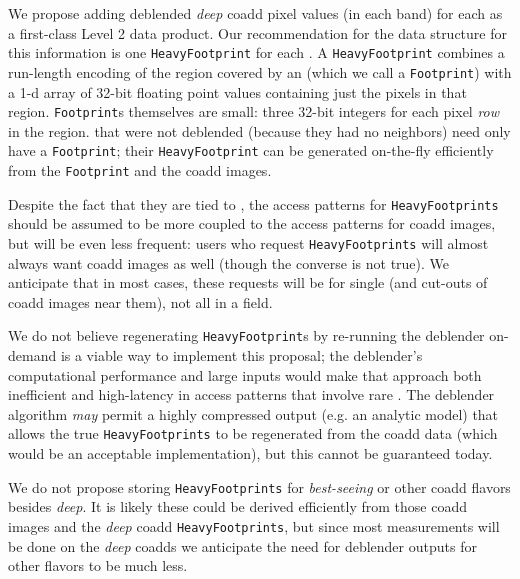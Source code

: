 \documentclass[DM,lsstdraft,toc]{lsstdoc}
\begin{document}
We propose adding deblended \emph{deep} coadd pixel values (in each band) for each \Object as a first-class Level 2 data product.  Our recommendation for the data structure for this information is one \texttt{HeavyFootprint} for each \Object.  A \texttt{HeavyFootprint} combines a run-length encoding of the region covered by an \Object (which we call a \texttt{Footprint}) with a 1-d array of 32-bit floating point values containing just the pixels in that region.  \texttt{Footprint}s themselves are small: three 32-bit integers for each pixel \emph{row} in the region.  \Objects that were not deblended (because they had no neighbors) need only have a \texttt{Footprint}; their \texttt{HeavyFootprint} can be generated on-the-fly efficiently from the \texttt{Footprint} and the coadd images.

Despite the fact that they are tied to \Objects, the access patterns for \texttt{HeavyFootprints} should be assumed to be more coupled to the access patterns for coadd images, but will be even less frequent: users who request \texttt{HeavyFootprints} will almost always want coadd images as well (though the converse is not true).  We anticipate that in most cases, these requests will be for single \Objects (and cut-outs of coadd images near them), not all \Objects in a field.

We do not believe regenerating \texttt{HeavyFootprint}s by re-running the deblender on-demand is a viable way to implement this proposal; the deblender's computational performance and large inputs would make that approach both inefficient and high-latency in access patterns that involve rare \Objects.  The deblender algorithm \emph{may} permit a highly compressed output (e.g. an analytic model) that allows the true \texttt{HeavyFootprints} to be regenerated from the coadd data (which would be an acceptable implementation), but this cannot be guaranteed today.

We do not propose storing \texttt{HeavyFootprints} for \emph{best-seeing} or other coadd flavors besides \emph{deep}.  It is likely these could be derived efficiently from those coadd images and the \emph{deep} coadd \texttt{HeavyFootprints}, but since most measurements will be done on the \emph{deep} coadds we anticipate the need for deblender outputs for other flavors to be much less.
\end{document}

